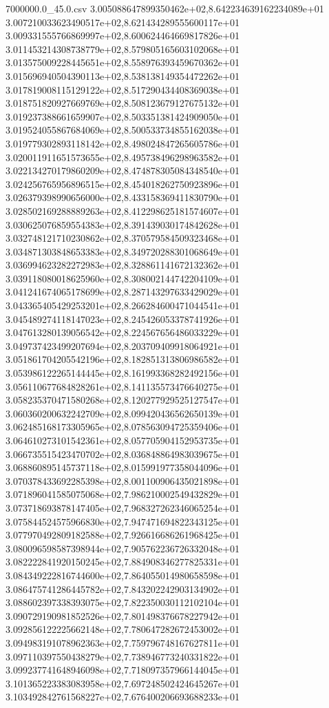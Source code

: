 \begin{filecontents*}{7000000.0_45.0.csv}
3.005088647899350462e+02,8.642234639162234089e+01
3.007210033623490517e+02,8.621434289555600117e+01
3.009331555766869997e+02,8.600624464669817826e+01
3.011453214308738779e+02,8.579805165603102068e+01
3.013575009228445651e+02,8.558976393459670362e+01
3.015696940504390113e+02,8.538138149354472262e+01
3.017819008115129122e+02,8.517290434408369038e+01
3.018751820927669769e+02,8.508123679127675132e+01
3.019237388661659907e+02,8.503351381424909050e+01
3.019524055867684069e+02,8.500533734855162038e+01
3.019779302893118142e+02,8.498024847265605786e+01
3.020011911651573655e+02,8.495738496298963582e+01
3.022134270179860209e+02,8.474878305084348540e+01
3.024256765956896515e+02,8.454018262750923896e+01
3.026379398990656000e+02,8.433158369411830790e+01
3.028502169288889263e+02,8.412298625181574607e+01
3.030625076859554383e+02,8.391439030174842628e+01
3.032748121710230862e+02,8.370579584509323468e+01
3.034871303848653383e+02,8.349720288301068649e+01
3.036994623282272983e+02,8.328861141672132362e+01
3.039118080018625960e+02,8.308002144742204109e+01
3.041241674065178699e+02,8.287143297633429029e+01
3.043365405429253201e+02,8.266284600471044541e+01
3.045489274118147023e+02,8.245426053378741926e+01
3.047613280139056542e+02,8.224567656486033229e+01
3.049737423499207694e+02,8.203709409918064921e+01
3.051861704205542196e+02,8.182851313806986582e+01
3.053986122265144445e+02,8.161993368282492156e+01
3.056110677684828261e+02,8.141135573476640275e+01
3.058235370471580268e+02,8.120277929525127547e+01
3.060360200632242709e+02,8.099420436562650139e+01
3.062485168173305965e+02,8.078563094725359406e+01
3.064610273101542361e+02,8.057705904152953735e+01
3.066735515423470702e+02,8.036848864983039675e+01
3.068860895145737118e+02,8.015991977358044096e+01
3.070378433692285398e+02,8.001100906435021898e+01
3.071896041585075068e+02,7.986210002549432829e+01
3.073718693878147405e+02,7.968327262346065254e+01
3.075844524575966830e+02,7.947471694822343125e+01
3.077970492809182588e+02,7.926616686261968425e+01
3.080096598587398944e+02,7.905762236726332048e+01
3.082222841920150245e+02,7.884908346277825331e+01
3.084349222816744600e+02,7.864055014980658598e+01
3.086475741286445782e+02,7.843202242903134902e+01
3.088602397338393075e+02,7.822350030112102104e+01
3.090729190981852526e+02,7.801498376678227942e+01
3.092856122225662148e+02,7.780647282672453002e+01
3.094983191078962363e+02,7.759796748167627811e+01
3.097110397550438279e+02,7.738946773240331822e+01
3.099237741648946098e+02,7.718097357966144045e+01
3.101365223383083958e+02,7.697248502424645267e+01
3.103492842761568227e+02,7.676400206693688233e+01

\end{filecontents*}

